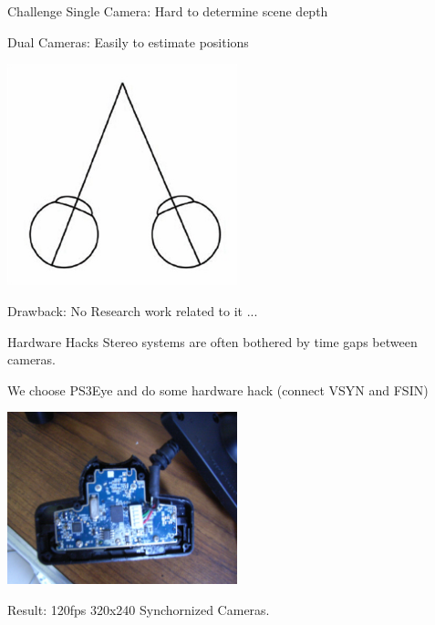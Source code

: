 \documentclass{beamer}
\begin{document}
	\begin{frame}{Challenge}
		Single Camera: Hard to determine scene depth \\
		\uncover<2->
		{
			Dual Cameras: Easily to estimate positions
			\begin{center}
				\includegraphics[width=0.5\textwidth]{./pics/dual.jpg} 
			\end{center}
		}
		{
			Drawback: No Research work related to it ...
		}
	\end{frame}

	\begin{frame}{Hardware Hacks}
		Stereo systems are often bothered by time gaps between cameras.\\
		\uncover<2->
		{
			We choose PS3Eye and do some hardware hack (connect VSYN and FSIN)
			\begin{center}
				\includegraphics[width=0.5\textwidth]{./pics/mia_pcb.jpg} 
			\end{center}
			Result: 120fps 320x240 Synchornized Cameras.
		}
	\end{frame}
\end{document}
